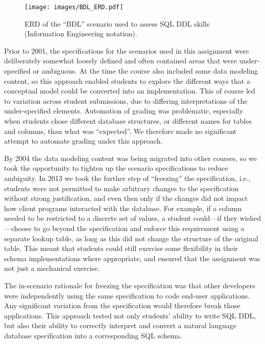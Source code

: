 \documentclass[sigconf, authordraft, capitalise]{acmart}
\begin{document}
 
\begin{figure}[hb]
    \centering
    \texttt{[image: images/BDL\_ERD.pdf]} 
    \caption{ERD of the ``BDL'' scenario used to assess SQL DDL skills (Information Engineering notation).}
    \label{fig-ERD}
\end{figure}


Prior to 2001, the specifications for the scenarios used in this assignment were deliberately somewhat loosely defined and often contained areas that were under-specified or ambiguous. At the time the course also included some data modeling content, so this approach enabled students to explore the different ways that a conceptual model could be converted into an implementation. This of course led to variation across student submissions, due to differing interpretations of the under-specified elements. Automation of grading was problematic, especially when students chose different database structures, or different names for tables and columns, than what was ``expected''. We therefore made no significant attempt to automate grading under this approach.

By 2004 the data modeling content was being migrated into other courses, so we took the opportunity to tighten up the scenario specifications to reduce ambiguity. In 2013 we took the further step of ``freezing'' the specification, i.e., students were not permitted to make arbitrary changes to the specification without strong justification, and even then only if the changes did not impact how client programs interacted with the database. For example, if a column needed to be restricted to a discrete set of values, a student could---if they wished---choose to go beyond the specification and enforce this requirement using a separate lookup table, as long as this did not change the structure of the original table. This meant that students could still exercise some flexibility in their schema implementations where appropriate, and ensured that the assignment was not just a mechanical exercise.

The in-scenario rationale for freezing the specification was that other developers were independently using the same specification to code end-user applications. Any significant variation from the specification would therefore break those applications. This approach tested not only students' ability to write SQL DDL, but also their ability to correctly interpret and convert a natural language database specification into a corresponding SQL schema.
\end{document}
